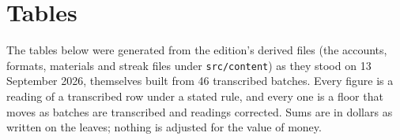 \chapter{Tables}

The tables below were generated from the edition's derived files (the accounts, formats, materials and streak files under \texttt{src/content}) as they stood on 13 September 2026, themselves built from 46 transcribed batches. Every figure is a reading of a transcribed row under a stated rule, and every one is a floor that moves as batches are transcribed and readings corrected. Sums are in dollars as written on the leaves; nothing is adjusted for the value of money.



